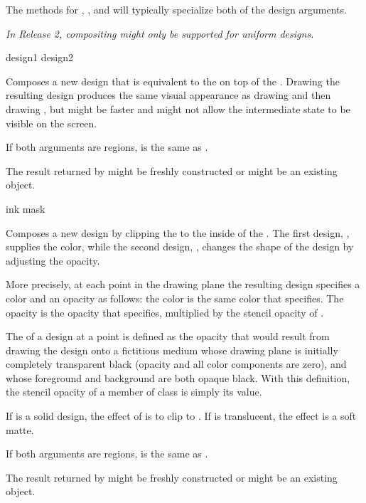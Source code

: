 The methods for , , and 
will typically specialize both of the design arguments.

{\sl In Release 2, compositing might only be supported for uniform designs.}


 {design1 design2}

Composes a new design that is equivalent to the   on
top of the  .  Drawing the resulting design produces
the same visual appearance as drawing  and then drawing
, but might be faster and might not allow the intermediate state to
be visible on the screen.

If both arguments are regions,  is the same as
.

\MayCaptureInputs
The result returned by  might be freshly constructed or might
be an existing object.


 {ink mask}

Composes a new design by clipping the   to the inside of
the  .  The first design, , supplies the color,
while the second design, , changes the shape of the design by
adjusting the opacity.

More precisely, at each point in the drawing plane the resulting design
specifies a color and an opacity as follows: the color is the same color that
 specifies.  The opacity is the opacity that  specifies,
multiplied by the stencil opacity of .

The  of a design at a point is defined as the opacity
that would result from drawing the design onto a fictitious medium whose drawing
plane is initially completely transparent black (opacity and all color
components are zero), and whose foreground and background are both opaque black.
With this definition, the stencil opacity of a member of class  is
simply its value.

If  is a solid design, the effect of  is to clip
 to .  If  is translucent, the effect is a soft
matte.

If both arguments are regions,  is the same as
.

\MayCaptureInputs
The result returned by  might be freshly constructed or might be
an existing object.


